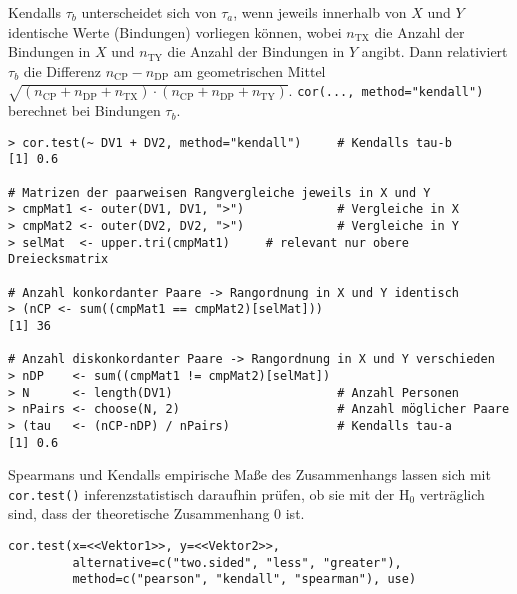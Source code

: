 Kendalls $\tau_{b}$ unterscheidet sich von $\tau_{a}$, wenn jeweils innerhalb von $X$ und $Y$ identische Werte (Bindungen) vorliegen können, wobei $n_{\text{TX}}$ die Anzahl der Bindungen in $X$ und $n_{\text{TY}}$ die Anzahl der Bindungen in $Y$ angibt. Dann relativiert $\tau_{b}$ die Differenz $n_{\text{CP}} - n_{\text{DP}}$ am geometrischen Mittel $\sqrt{(n_{\text{CP}} + n_{\text{DP}} + n_{\text{TX}}) \cdot (n_{\text{CP}} + n_{\text{DP}} + n_{\text{TY}})}$. \lstinline!cor(..., method="kendall")! berechnet bei Bindungen $\tau_{b}$.
\begin{lstlisting}
> cor.test(~ DV1 + DV2, method="kendall")     # Kendalls tau-b
[1] 0.6

# Matrizen der paarweisen Rangvergleiche jeweils in X und Y
> cmpMat1 <- outer(DV1, DV1, ">")             # Vergleiche in X
> cmpMat2 <- outer(DV2, DV2, ">")             # Vergleiche in Y
> selMat  <- upper.tri(cmpMat1)     # relevant nur obere Dreiecksmatrix

# Anzahl konkordanter Paare -> Rangordnung in X und Y identisch
> (nCP <- sum((cmpMat1 == cmpMat2)[selMat]))
[1] 36

# Anzahl diskonkordanter Paare -> Rangordnung in X und Y verschieden
> nDP    <- sum((cmpMat1 != cmpMat2)[selMat])
> N      <- length(DV1)                       # Anzahl Personen
> nPairs <- choose(N, 2)                      # Anzahl möglicher Paare
> (tau   <- (nCP-nDP) / nPairs)               # Kendalls tau-a
[1] 0.6
\end{lstlisting}

Spearmans und Kendalls empirische Maße des Zusammenhangs lassen sich mit \lstinline!cor.test()! inferenzstatistisch daraufhin prüfen, ob sie mit der $\text{H}_{0}$ verträglich sind, dass der theoretische Zusammenhang $0$ ist.
\begin{lstlisting}
cor.test(x=<<Vektor1>>, y=<<Vektor2>>, 
         alternative=c("two.sided", "less", "greater"),
         method=c("pearson", "kendall", "spearman"), use)
\end{lstlisting}

